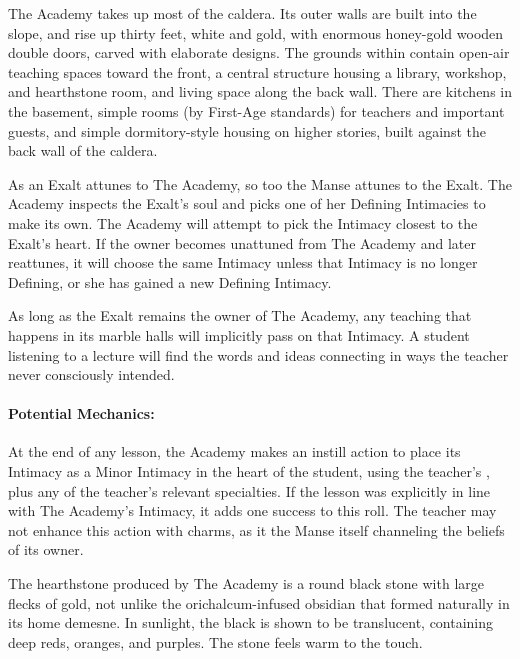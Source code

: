 The Academy takes up most of the caldera. Its outer walls are built into the
slope, and rise up thirty feet, white and gold, with enormous honey-gold wooden
double doors, carved with elaborate designs. The grounds within contain
open-air teaching spaces toward the front, a central structure housing a
library, workshop, and hearthstone room, and living space along the back wall.
There are kitchens in the basement, simple rooms (by First-Age standards)
for teachers and important guests, and simple dormitory-style housing on higher
stories, built against the back wall of the caldera.


As an Exalt attunes to The Academy, so too the Manse attunes to the Exalt. The
Academy inspects the Exalt's soul and picks one of her Defining Intimacies to
make its own. The Academy will attempt to pick the Intimacy closest to the
Exalt's heart. If the owner becomes unattuned from The Academy and later
reattunes, it will choose the same Intimacy unless that Intimacy is no longer
Defining, or she has gained a new Defining Intimacy.

As long as the Exalt remains the owner of The Academy, any teaching that
happens in its marble halls will implicitly pass on that Intimacy. A student
listening to a lecture will find the words and ideas connecting in ways the
teacher never consciously intended.

\paragraph{Potential Mechanics:} At the end of any lesson, the Academy makes an
instill action to place its Intimacy as a Minor Intimacy in the heart of the
student, using the teacher's ,
plus any of the teacher's relevant specialties. If the lesson was explicitly in
line with The Academy's Intimacy, it adds one success to this roll. The teacher
may not enhance this action with charms, as it the Manse itself channeling the
beliefs of its owner.



The hearthstone produced by The Academy is a round black stone with large
flecks of gold, not unlike the orichalcum-infused obsidian that formed
naturally in its home demesne. In sunlight, the black is shown to be
translucent, containing deep reds, oranges, and purples. The stone feels warm
to the touch.


